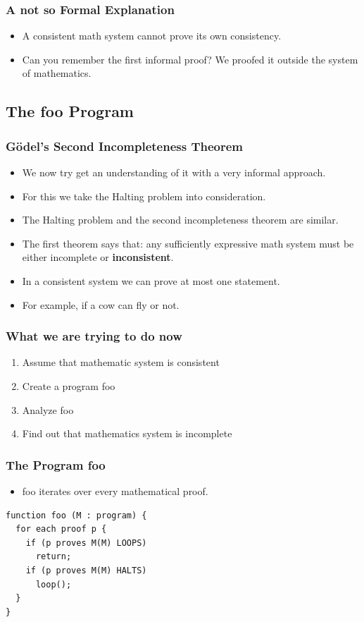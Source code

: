 \documentclass[aspectratio=169]{beamer}
\begin{document}
\begin{frame}
	\frametitle{A not so Formal Explanation}
	\begin{itemize}
		\item A consistent math system cannot prove its own consistency.
		\item Can you remember the first informal proof? We proofed it outside the system of mathematics.
		\hyperlink{important}{}
	\end{itemize}
\end{frame}

\subsection{The foo Program}
\begin{frame}
	\frametitle{Gödel's Second Incompleteness Theorem}
	\begin{itemize}
		\item We now try get an understanding of it with a very informal approach.
		\item For this we take the Halting problem into consideration.
		\item The Halting problem and the second incompleteness theorem are similar.
		\item The first theorem says that: any sufficiently expressive math system must be either incomplete or \textbf{inconsistent}.
		\item In a consistent system we can prove at most one statement. 
		\item [] For example, if a cow can fly or not.
	\end{itemize}
\end{frame}

\begin{frame}
	\frametitle{What we are trying to do now}
	\begin{enumerate}
		\item Assume that mathematic system is consistent
		\item Create a program foo
		\item Analyze foo
		\item Find out that mathematics system is incomplete
	\end{enumerate}
\end{frame}

\begin{frame}[fragile]
	\frametitle{The Program foo}
	\begin{itemize}
		\item foo iterates over every mathematical proof.
	\end{itemize}
	\begin{center}
	  \begin{lstlisting}[frame=single]
function foo (M : program) {
  for each proof p {
    if (p proves M(M) LOOPS) 
      return;
    if (p proves M(M) HALTS)
      loop();
  }
}
   \end{lstlisting}
   	\end{center}
\end{frame}
\end{document}
